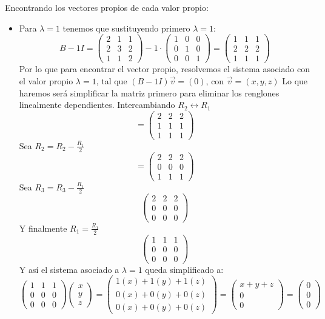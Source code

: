 \begin{itemize}
    Encontrando los vectores propios de cada valor propio:
    \begin{itemize}
        \item Para $\lambda=1$ tenemos que sustituyendo primero $\lambda=1$:
    $$B-1I=\begin{pmatrix}2&1&1\\ 2&3&2\\ 1&1&2\end{pmatrix}-1\cdot \begin{pmatrix}1&0&0\\ 0&1&0\\ 0&0&1\end{pmatrix}=\begin{pmatrix}1&1&1\\ 2&2&2\\ 1&1&1\end{pmatrix}$$
    Por lo que para encontrar el vector propio, resolvemos el sistema asociado con el valor propio $\lambda=1$, tal que $(B-1I)\vec{v}=(0)$, con $\vec{v}=(x,y,z)$
    Lo que haremos ser\'a simplificar la matriz primero para eliminar los renglones linealmente dependientes. Intercambiando $R_2 \leftrightarrow R_1$    $$=\begin{pmatrix}2&2&2\\ 1&1&1\\ 1&1&1\end{pmatrix}$$    Sea $R_2=R_2-\frac{R_1}{2}$   $$=\begin{pmatrix}2&2&2\\ 0&0&0\\ 1&1&1\end{pmatrix}$$    Sea $R_3=R_3-\frac{R_1}{2}$    $$\begin{pmatrix}2&2&2\\ 0&0&0\\ 0&0&0\end{pmatrix}$$    Y finalmente $R_1=\frac{R_1}{2}$    $$\begin{pmatrix}1&1&1\\ 0&0&0\\ 0&0&0\end{pmatrix}$$    Y así el sistema asociado a $\lambda=1$ queda simplificado a:    $$\begin{pmatrix}1&1&1\\ 0&0&0\\ 0&0&0\end{pmatrix}\begin{pmatrix}x\\ y\\ z\end{pmatrix}=\begin{pmatrix}1(x)+1(y)+1(z)\\ 0(x)+0(y)+0(z)\\0(x)+0(y)+0(z)\end{pmatrix}=\begin{pmatrix}x+y+z\\ 0\\0\end{pmatrix}=\begin{pmatrix}0\\ 0\\ 0\end{pmatrix}$$

\end{itemize}
\end{itemize}

